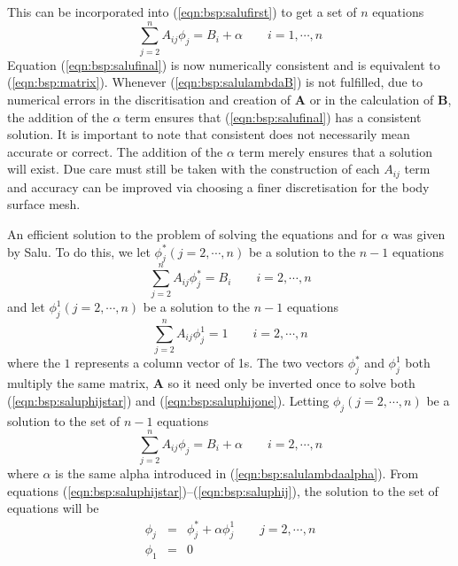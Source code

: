 This can be incorporated into (\ref{eqn:bsp:salufirst}) to get a set of $n$
equations
\begin{equation}
\label{eqn:bsp:salufinal}
\sum_{j=2}^n A_{ij} \phi_j = B_i + \alpha \quad\quad  i = 1,\cdots, n
\end{equation}
Equation (\ref{eqn:bsp:salufinal}) is now numerically consistent and is
equivalent to (\ref{eqn:bsp:matrix}).
Whenever (\ref{eqn:bsp:salulambdaB}) is not fulfilled, due to numerical errors
in the discritisation and creation of $\textbf{A}$ or in the calculation of
$\textbf{B}$, the addition of the $\alpha$ term ensures that
(\ref{eqn:bsp:salufinal}) has a consistent solution.
It is important to note that consistent does not necessarily mean accurate
or correct.
The addition of the $\alpha$ term merely ensures that a solution will exist.
Due care must still be taken with the construction of each $A_{ij}$ term and
accuracy can be improved via choosing a finer discretisation for the body
surface mesh.

An efficient solution to the problem of solving the equations and for $\alpha$
was given by Salu.
To do this, we let $\phi_j^* \left(j=2,\cdots,n\right)$ be a solution to the
$n-1$ equations
\begin{equation}
\label{eqn:bsp:saluphijstar}
\sum_{j=2}^n A_{ij} \phi_j^* = B_i \quad\quad  i = 2,\cdots, n
\end{equation}
and let $\phi_j^1 \left(j=2,\cdots,n\right)$ be a solution to the $n-1$
equations
\begin{equation}
\label{eqn:bsp:saluphijone}
\sum_{j=2}^n A_{ij} \phi_j^1 = 1 \quad\quad  i = 2,\cdots, n
\end{equation}
where the $1$ represents a column vector of 1s.
The two vectors $\phi_j^*$ and $\phi_j^1$ both multiply the same matrix,
$\mathbf{A}$ so it need only be inverted once to solve both
(\ref{eqn:bsp:saluphijstar}) and (\ref{eqn:bsp:saluphijone}).
Letting $\phi_j \left(j=2,\cdots,n\right)$ be a solution to the set of $n-1$
equations
\begin{equation}
\label{eqn:bsp:saluphij}
\sum_{j=2}^n A_{ij} \phi_j = B_i + \alpha \quad\quad  i = 2,\cdots, n
\end{equation}
where $\alpha$ is the same alpha introduced in (\ref{eqn:bsp:salulambdaalpha}).
From equations (\ref{eqn:bsp:saluphijstar})--(\ref{eqn:bsp:saluphij}), the
solution to the set of equations will be
\begin{eqnarray}
\label{eqn:bsp:salusolution}
\phi_j&=&\phi_j^* + \alpha\phi_j^1 \quad\quad  j = 2,\cdots, n \nonumber\\
\phi_1&=&0
\end{eqnarray}


